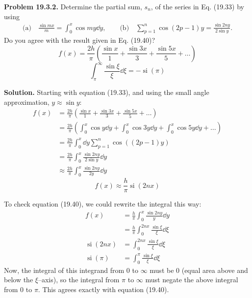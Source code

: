 \documentclass{article}
\begin{document}
\hrulefill

\textbf{Problem 19.3.2.} Determine the partial sum, $s_n$, of the series in Eq. (19.33) by using
\begin{equation*}
\begin{aligned}
    \text{(a)}\quad \frac{\sin mx}{m} = \int_0^x \cos my\dd y,\quad\quad\text{(b)}\quad \sum_{p=1}^n \cos(2p-1)y = \frac{\sin 2ny}{2\sin y}.
\end{aligned}
\end{equation*}
Do you agree with the result given in Eq. (19.40)?
\begin{equation}
    f(x) = \frac{2h}{\pi}\left(\frac{\sin x}{1} + \frac{\sin 3x}{3} + \frac{\sin 5x}{5} + \ldots\right) \tag{19.33}\label{eq:19.33}
\end{equation}
\begin{equation}
    \int_\pi^\infty \frac{\sin\xi}{\xi}\dd\xi = -\mathop{\text{si}}{(\pi)} \tag{19.40}\label{eq:19.40}
\end{equation}

\textbf{Solution.} Starting with equation (19.33), and using the small angle approximation, $y\approx\sin y$:
\begin{equation*}
\begin{aligned}
    f(x) &= \frac{2h}{\pi}\left(\frac{\sin x}{1} + \frac{\sin 3x}{3} + \frac{\sin 5x}{5} + \ldots\right) \\
    &= \frac{2h}{\pi}\left(\int_0^x \cos y\dd y + \int_0^x \cos 3y\dd y + \int_0^x \cos 5y\dd y + \ldots\right) \\
    &= \frac{2h}{\pi}\int_0^x  \dd y\sum_{p=1}^n \cos((2p-1)y) \\
    &= \frac{2h}{\pi}\int_0^x \frac{\sin 2ny}{2\sin y}\dd y \\
    &\approx \frac{2h}{\pi}\int_0^x \frac{\sin 2n y}{2y}\dd y
\end{aligned}
\end{equation*}
\begin{equation}
    \boxed{f(x) \approx \frac{h}{\pi}\mathop{\text{si}}{(2nx)}}\tag{19.3.2}\label{eq:19.3.2}
\end{equation}
    
To check equation (19.40), we could rewrite the integral this way:
\begin{equation*}
\begin{aligned}
    f(x) &= \frac{h}{\pi}\int_0^x \frac{\sin 2n y}{y}\dd y \\
    &= \frac{h}{\pi}\int_0^{2nx} \frac{\sin\xi}{\xi}\dd\xi \\
    \mathop{\text{si}}{(2nx)} &= \int_0^{2nx} \frac{\sin\xi}{\xi}\dd\xi \\
    \mathop{\text{si}}{(\pi)} &= \int_0^{\pi} \frac{\sin\xi}{\xi}\dd\xi
\end{aligned}
\end{equation*}
Now, the integral of this integrand from 0 to $\infty$ must be 0 (equal area above and below the $\xi$--axis), so the integral from $\pi$ to $\infty$ must negate the above integral from 0 to $\pi$. This agrees exactly with equation (19.40).
\end{document}
